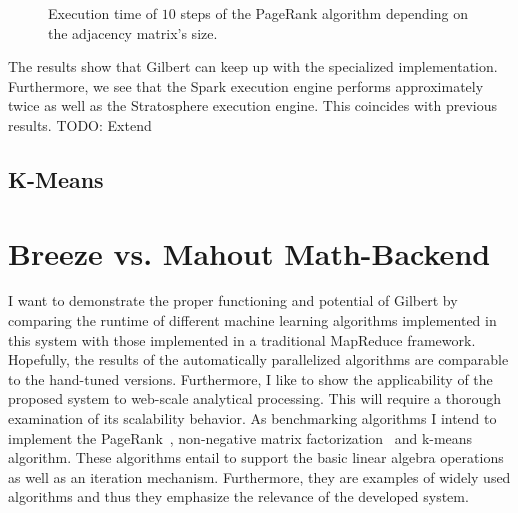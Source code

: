 \begin{figure}
	\centering
	\caption{Execution time of $10$ steps of the PageRank algorithm depending on the adjacency matrix's size.}
	\label{fig:pageRankResults}
\end{figure}

The results show that Gilbert can keep up with the specialized implementation.
Furthermore, we see that the Spark execution engine performs approximately twice as well as the Stratosphere execution engine.
This coincides with previous results.
TODO: Extend

\subsection{K-Means}



\section{Breeze vs. Mahout Math-Backend}

I want to demonstrate the proper functioning and potential of Gilbert by comparing the runtime of different machine learning algorithms implemented in this system with those implemented in a traditional MapReduce framework.
Hopefully, the results of the automatically parallelized algorithms are comparable to the hand-tuned versions.
Furthermore, I like to show the applicability of the proposed system to web-scale analytical processing.
This will require a thorough examination of its scalability behavior.
As benchmarking algorithms I intend to implement the PageRank~\cite{page:1999a}, non-negative matrix factorization~\cite{seung:anips2001a} and k-means~\cite{macqueen:1967a} algorithm.
These algorithms entail to support the basic linear algebra operations as well as an iteration mechanism.
Furthermore, they are examples of widely used algorithms and thus they emphasize the relevance of the developed system.